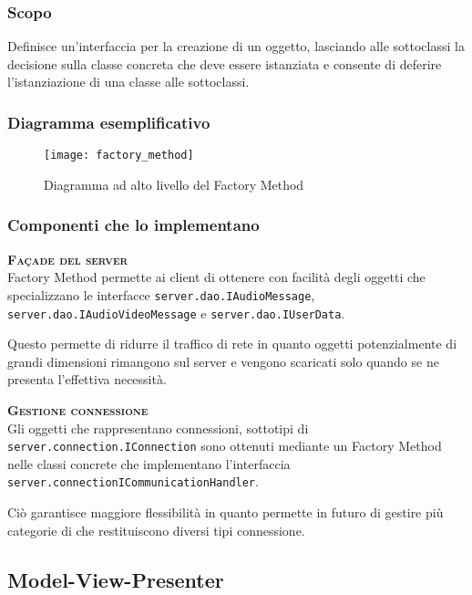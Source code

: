 \subsubsection{Scopo}
Definisce un'interfaccia per la creazione di un oggetto, lasciando alle sottoclassi la decisione sulla classe concreta che deve essere istanziata e consente di deferire l'istanziazione di una classe alle sottoclassi.

\subsubsection{Diagramma esemplificativo}
\begin{figure}[H]
\centering
\texttt{[image: factory\_method]}
\caption{Diagramma ad alto livello del  Factory Method}\label{fig:factory_method}
\end{figure}

\subsubsection{Componenti che lo implementano}
\begin{description}
  \item{\scshape\bfseries Façade del server}\\
Factory Method permette ai client di ottenere con facilità degli oggetti  che specializzano le interfacce \texttt{server.dao.IAudioMessage}, \texttt{server.dao.IAudioVideoMessage} e \texttt{server.dao.IUserData}.

Questo permette di ridurre il traffico di rete in quanto oggetti potenzialmente di grandi dimensioni rimangono sul server e vengono scaricati solo quando se ne presenta l'effettiva necessità.
  \item{\scshape\bfseries Gestione connessione}\\
Gli oggetti che rappresentano connessioni, sottotipi di \texttt{server.connection.IConnection} sono ottenuti mediante un Factory Method nelle classi concrete che implementano l'interfaccia \texttt{server.connectionICommunicationHandler}.

Ciò garantisce maggiore flessibilità in quanto permette in futuro di gestire più categorie di  che restituiscono diversi tipi connessione.
\end{description}

\subsection{Model-View-Presenter}\label{sec:MVP}


